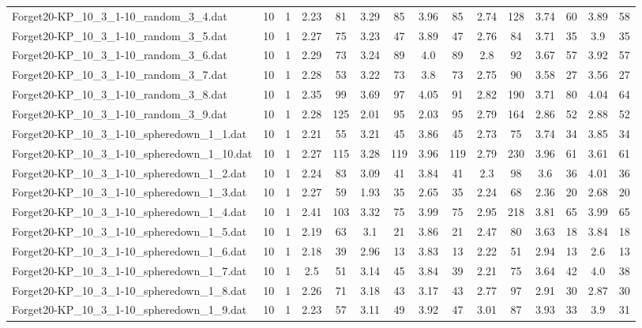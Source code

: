 \begin{table}[!ht]
{\begin{tabular}{lcccccccccccccc}
Forget20-KP\_10\_3\_1-10\_random\_3\_4.dat & 10 & 1 & 2.23 & 81 & 3.29 & 85 & 3.96 & 85 & 2.74 & 128 & 3.74 & 60 & 3.89 & 58 \\
Forget20-KP\_10\_3\_1-10\_random\_3\_5.dat & 10 & 1 & 2.27 & 75 & 3.23 & 47 & 3.89 & 47 & 2.76 & 84 & 3.71 & 35 & 3.9 & 35 \\
Forget20-KP\_10\_3\_1-10\_random\_3\_6.dat & 10 & 1 & 2.29 & 73 & 3.24 & 89 & 4.0 & 89 & 2.8 & 92 & 3.67 & 57 & 3.92 & 57 \\
Forget20-KP\_10\_3\_1-10\_random\_3\_7.dat & 10 & 1 & 2.28 & 53 & 3.22 & 73 & 3.8 & 73 & 2.75 & 90 & 3.58 & 27 & 3.56 & 27 \\
Forget20-KP\_10\_3\_1-10\_random\_3\_8.dat & 10 & 1 & 2.35 & 99 & 3.69 & 97 & 4.05 & 91 & 2.82 & 190 & 3.71 & 80 & 4.04 & 64 \\
Forget20-KP\_10\_3\_1-10\_random\_3\_9.dat & 10 & 1 & 2.28 & 125 & 2.01 & 95 & 2.03 & 95 & 2.79 & 164 & 2.86 & 52 & 2.88 & 52 \\
Forget20-KP\_10\_3\_1-10\_spheredown\_1\_1.dat & 10 & 1 & 2.21 & 55 & 3.21 & 45 & 3.86 & 45 & 2.73 & 75 & 3.74 & 34 & 3.85 & 34 \\
Forget20-KP\_10\_3\_1-10\_spheredown\_1\_10.dat & 10 & 1 & 2.27 & 115 & 3.28 & 119 & 3.96 & 119 & 2.79 & 230 & 3.96 & 61 & 3.61 & 61 \\
Forget20-KP\_10\_3\_1-10\_spheredown\_1\_2.dat & 10 & 1 & 2.24 & 83 & 3.09 & 41 & 3.84 & 41 & 2.3 & 98 & 3.6 & 36 & 4.01 & 36 \\
Forget20-KP\_10\_3\_1-10\_spheredown\_1\_3.dat & 10 & 1 & 2.27 & 59 & 1.93 & 35 & 2.65 & 35 & 2.24 & 68 & 2.36 & 20 & 2.68 & 20 \\
Forget20-KP\_10\_3\_1-10\_spheredown\_1\_4.dat & 10 & 1 & 2.41 & 103 & 3.32 & 75 & 3.99 & 75 & 2.95 & 218 & 3.81 & 65 & 3.99 & 65 \\
Forget20-KP\_10\_3\_1-10\_spheredown\_1\_5.dat & 10 & 1 & 2.19 & 63 & 3.1 & 21 & 3.86 & 21 & 2.47 & 80 & 3.63 & 18 & 3.84 & 18 \\
Forget20-KP\_10\_3\_1-10\_spheredown\_1\_6.dat & 10 & 1 & 2.18 & 39 & 2.96 & 13 & 3.83 & 13 & 2.22 & 51 & 2.94 & 13 & 2.6 & 13 \\
Forget20-KP\_10\_3\_1-10\_spheredown\_1\_7.dat & 10 & 1 & 2.5 & 51 & 3.14 & 45 & 3.84 & 39 & 2.21 & 75 & 3.64 & 42 & 4.0 & 38 \\
Forget20-KP\_10\_3\_1-10\_spheredown\_1\_8.dat & 10 & 1 & 2.26 & 71 & 3.18 & 43 & 3.17 & 43 & 2.77 & 97 & 2.91 & 30 & 2.87 & 30 \\
Forget20-KP\_10\_3\_1-10\_spheredown\_1\_9.dat & 10 & 1 & 2.23 & 57 & 3.11 & 49 & 3.92 & 47 & 3.01 & 87 & 3.93 & 33 & 3.9 & 31 \\

\end{tabular}}
\end{table}
